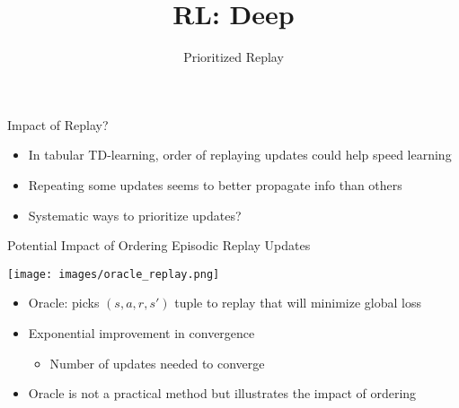 \documentclass[aspectratio=169]{../latex_main/tntbeamer}  %
\title[RL: Deep Reinforcement Learning]{RL: Deep}
\subtitle{Prioritized Replay}
\begin{document}
	
	\maketitle

\begin{frame}[c]{Impact of Replay?}
	

\begin{itemize}
	\item In tabular TD-learning, \alert{order} of replaying updates could help speed
	learning
	\item Repeating some updates seems to better propagate info than others
	\item Systematic ways to prioritize updates?
\end{itemize}
	
\end{frame}
\begin{frame}[c]{Potential Impact of Ordering Episodic Replay Updates~}
	
	\texttt{[image: images/oracle\_replay.png]}
	
	\begin{itemize}
		\item Oracle: picks $(s, a, r , s' )$ tuple to replay that will minimize global loss
		\item Exponential improvement in convergence
		\begin{itemize}
			\item 		Number of updates needed to converge
		\end{itemize}
		\item Oracle is not a practical method but illustrates the impact of ordering
	\end{itemize}
	
\end{frame}
\end{document}

